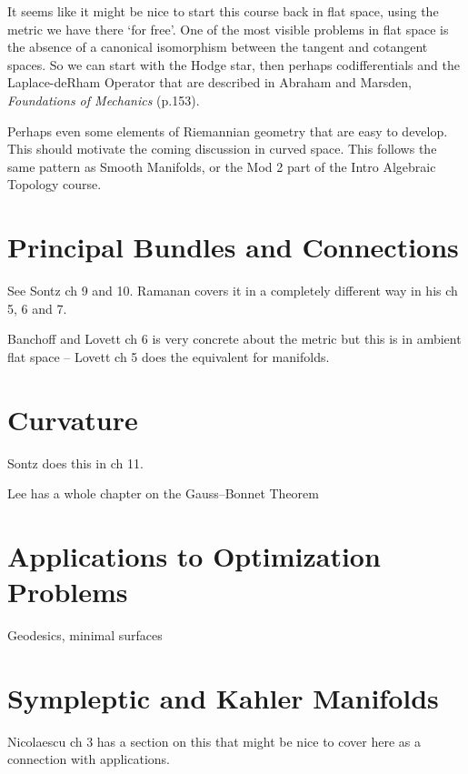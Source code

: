 \documentclass[oneside,english]{amsbook}
\numberwithin{section}{chapter}
\theoremstyle{plain}
\theoremstyle{definition}
\begin{document}
			It seems like it might be nice to start this course back in flat space, using the metric we have there `for free'. One of the most visible problems in flat space is the absence of a canonical isomorphism between the tangent and cotangent spaces. So we can start with the Hodge star, then perhaps codifferentials and  the Laplace-deRham Operator that are described in Abraham and Marsden, \emph{Foundations of Mechanics} (p.153). 
			
			Perhaps even some elements of Riemannian geometry that are easy to develop. This should motivate the coming discussion in curved space. This follows the same pattern as Smooth Manifolds, or the Mod 2 part of the Intro Algebraic Topology course.

	\chapter{Principal Bundles and Connections}
		
		See Sontz ch 9 and 10. Ramanan covers it in a completely different way in his ch 5, 6 and 7. 
		
		Banchoff and Lovett ch 6 is very concrete about the metric but this is in ambient flat space -- Lovett ch 5 does the equivalent for manifolds.
	
	\chapter{Curvature}
	
		Sontz does this in ch 11.
		
		Lee has a whole chapter on the Gauss–Bonnet Theorem

	\chapter{Applications to Optimization Problems}
	
		Geodesics, minimal surfaces
	
	\chapter{Sympleptic and K\:ahler Manifolds}
		Nicolaescu ch 3 has a section on this that might be nice to cover here as a connection with applications.
		

	
\end{document}
